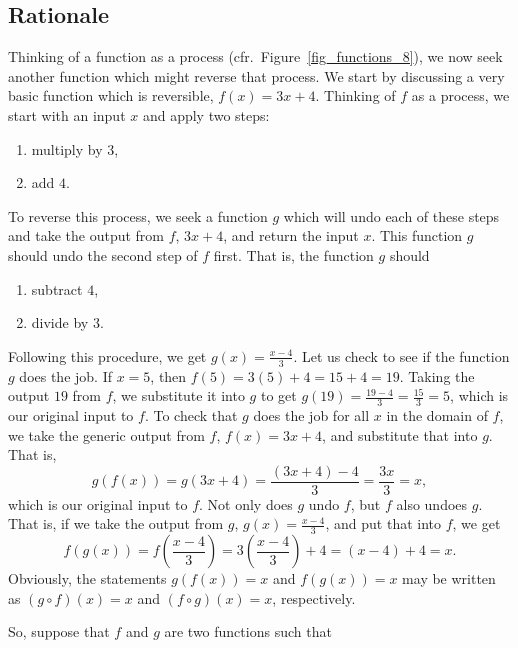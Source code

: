 \subsection{Rationale}
Thinking of a function as a process (cfr.\ Figure~\ref{fig_functions_8}),  we now seek another function which might reverse that process.   We start by discussing a very basic function which is reversible, $f(x) = 3x+4$.  Thinking of $f$ as a process, we start with an input $x$ and apply two steps: 
\begin{enumerate}

\item multiply by $3$,
\item add $4$.

\end{enumerate}

To reverse this process, we seek a function $g$ which will undo each of these steps and take the output from $f$, $3x+4$, and return the input $x$.  This function $g$ should undo the second step of $f$ first.  That is, the function $g$ should

\begin{enumerate}

\item  subtract $4$, 

\item  divide by $3$.

\end{enumerate}

Following this procedure,   we get $g(x) = \frac{x-4}{3}$.  Let us check to see if the function $g$ does the job.  If $x=5$, then $f(5) = 3(5)+4 = 15+4 = 19$.  Taking the output $19$ from $f$, we substitute it into $g$ to get $g(19) = \frac{19-4}{3} = \frac{15}{3} = 5$, which is our original input to $f$. To check that $g$ does the job for all $x$ in the domain of $f$, we take the generic output from $f$, $f(x) = 3x+4$, and substitute that into $g$.  That is, $$g(f(x)) = g(3x+4) = \dfrac{(3x+4)-4}{3} = \dfrac{3x}{3} = x,$$
which is our original input to $f$.   Not only does $g$ undo $f$, but $f$ also undoes $g$.  That is, if we take the output from $g$, $g(x) = \frac{x-4}{3}$, and put that into $f$, we get 
$$f(g(x)) = f\left(\dfrac{x-4}{3}\right) = 3 \left(\dfrac{x-4}{3}\right) + 4 = (x-4) + 4 = x.$$
Obviously, the statements $g(f(x)) = x$ and $f(g(x)) = x$ may be written as $(g \circ f)(x) = x$ and $(f \circ g)(x) = x$, respectively.   

So, suppose that $f$ and $g$ are two functions such that

